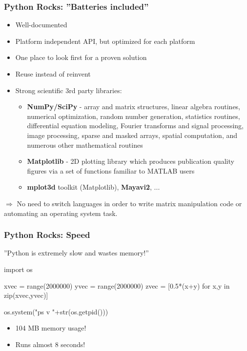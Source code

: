 \documentclass[t,10pt,compress=false,usepdftitle=false]{beamer}
\begin{document}
\begin{frame}[fragile]
    \frametitle{Python Rocks: ''Batteries included''}
    \begin{itemize}
        \item Well-documented
        \item Platform independent API, but optimized for each platform
        \item One place to look first for a proven solution
        \item Reuse instead of reinvent
        \pause
        \item Strong scientific 3rd party libraries:
        \begin{itemize}
            \item \textbf{NumPy/SciPy} - array and matrix structures, linear algebra routines, numerical optimization, random number generation, statistics routines, differential equation modeling, Fourier transforms and signal processing, image processing, sparse and masked arrays, spatial computation, and numerous other mathematical routines
            \item \textbf{Matplotlib} - 2D plotting library which produces publication quality figures via a set of functions familiar to MATLAB users
            \item \textbf{mplot3d} toolkit (Matplotlib), \textbf{Mayavi2}, ...
        \end{itemize}
    \end{itemize}
    \pause
    $\Longrightarrow$ No need to switch languages in order to write matrix manipulation code or automating an operating system task.
\end{frame}


\begin{frame}[fragile]
    \frametitle{Python Rocks: Speed}
    ''Python is extremely slow and wastes memory!''
\begin{myColorBox}{0.9}{}
\begin{semiverbatim}
import os

xvec = range(2000000)
yvec = range(2000000)
zvec = [0.5*(x+y) for x,y in zip(xvec,yvec)]

os.system("ps v "+str(os.getpid()))
\end{semiverbatim}
\end{myColorBox}
    \begin{itemize}
    	\item 104 MB memory usage!
	\item Runs almost 8 seconds!
    \end{itemize}
\end{frame}
\end{document}
